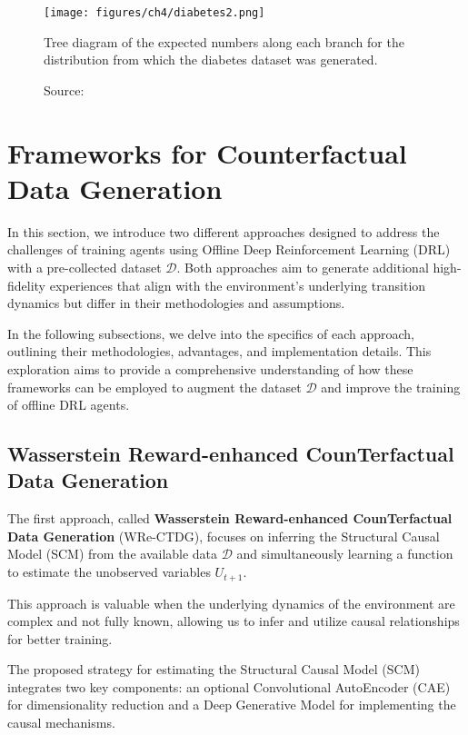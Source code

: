 \begin{figure}[h]
    \centering
    \texttt{[image: figures/ch4/diabetes2.png]}
    \caption{Tree diagram of the expected numbers
    along each branch for the distribution from which the diabetes
    dataset was generated.}
    \vspace{-10px}
    \caption*{\scriptsize{Source: \cite{sim2012}}}
    \label{fig:diabetes2}
\end{figure}

\section{Frameworks for Counterfactual Data Generation}

In this section, we introduce two different approaches designed to
address the challenges of training agents using Offline
Deep Reinforcement Learning (DRL) with a pre-collected dataset \( \mathcal{D} \).
Both approaches aim to generate additional high-fidelity experiences
that align with the environment's underlying transition dynamics
but differ in their methodologies and assumptions.

In the following subsections, we delve into the specifics
of each approach, outlining their methodologies, advantages, and
implementation details. This exploration aims to
provide a comprehensive understanding of how these
frameworks can be employed to augment the dataset \( \mathcal{D} \) and improve
the training of offline DRL agents.

\subsection{Wasserstein Reward-enhanced CounTerfactual\\ Data Generation}
\label{sec:wre}

The first approach, called \textbf{Wasserstein Reward-enhanced CounTerfactual Data Generation}
(WRe-CTDG),
focuses on inferring the Structural Causal Model
(SCM) from the available data \( \mathcal{D} \) and simultaneously learning
a function to estimate the unobserved variables $U_{t+1}$.

This approach is valuable when the underlying dynamics of the
environment are complex and not fully known, allowing us to
infer and utilize causal relationships for better training.

The proposed strategy for estimating the Structural Causal Model (SCM)
integrates two key components: an optional Convolutional AutoEncoder (CAE)
for dimensionality reduction and a Deep Generative Model for
implementing the causal mechanisms.

